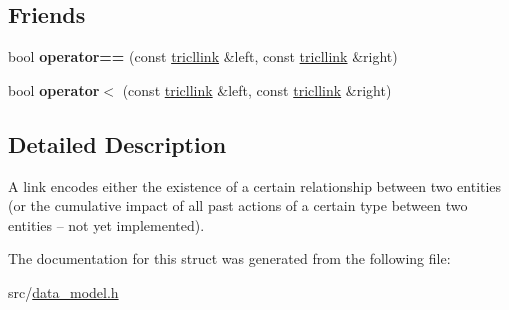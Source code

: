 \subsection*{Friends}
\begin{DoxyCompactItemize}
\item 
\mbox{\label{structtricl_1_1tricllink_a9e7da803472b5df141fcc160eb0810d9}} 
bool {\bfseries operator==} (const \hyperlink{structtricl_1_1tricllink}{tricllink} \&left, const \hyperlink{structtricl_1_1tricllink}{tricllink} \&right)
\item 
\mbox{\label{structtricl_1_1tricllink_a431ac5bcbab6098392f451d1144cda04}} 
bool {\bfseries operator$<$} (const \hyperlink{structtricl_1_1tricllink}{tricllink} \&left, const \hyperlink{structtricl_1_1tricllink}{tricllink} \&right)
\end{DoxyCompactItemize}


\subsection{Detailed Description}
A link encodes either the existence of a certain relationship between two entities (or the cumulative impact of all past actions of a certain type between two entities -- not yet implemented). 

The documentation for this struct was generated from the following file\+:\begin{DoxyCompactItemize}
\item 
src/\hyperlink{data__model_8h}{data\+\_\+model.\+h}\end{DoxyCompactItemize}
